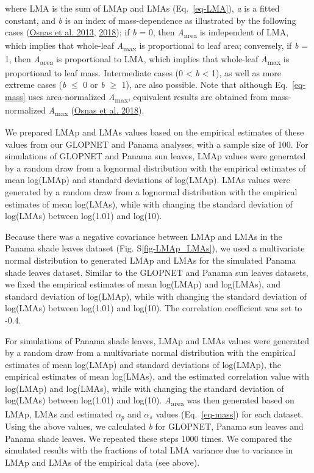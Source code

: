 \documentclass[
  12pt,
  a4paper,
,tablecaptionabove
]{scrartcl}
\begin{document}
where LMA is the sum of LMAp and LMAs (Eq.~\ref{eq-LMA}), \emph{a} is a
fitted constant, and \emph{b} is an index of mass-dependence as
illustrated by the following cases
(\protect\hyperlink{ref-Osnas2013}{Osnas et al. 2013},
\protect\hyperlink{ref-Osnas2018}{2018}): if \emph{b} = 0, then
\emph{A}\textsubscript{area} is independent of LMA, which implies that
whole-leaf \emph{A}\textsubscript{max} is proportional to leaf area;
conversely, if \emph{b} = 1, then \emph{A}\textsubscript{area} is
proportional to LMA, which implies that whole-leaf
\emph{A}\textsubscript{max} is proportional to leaf mass. Intermediate
cases (0 \textless{} \emph{b} \textless{} 1), as well as more extreme
cases (\emph{b} \(\leq\) 0 or \emph{b} \(\geq\) 1), are also possible.
Note that although Eq.~\ref{eq-mass} uses area-normalized
\emph{A}\textsubscript{max}, equivalent results are obtained from
mass-normalized \emph{A}\textsubscript{max}
(\protect\hyperlink{ref-Osnas2018}{Osnas et al. 2018}).

We prepared LMAp and LMAs values based on the empirical estimates of
these values from our GLOPNET and Panama analyses, with a sample size of
100. For simulations of GLOPNET and Panama sun leaves, LMAp values were
generated by a random draw from a lognormal distribution with the
empirical estimates of mean log(LMAp) and standard deviations of
log(LMAp). LMAs values were generated by a random draw from a lognormal
distribution with the empirical estimates of mean log(LMAs), while with
changing the standard deviation of log(LMAs) between log(1.01) and
log(10).

Because there was a negative covariance between LMAp and LMAs in the
Panama shade leaves dataset (Fig. S\ref{fig-LMAp_LMAs}), we used a
multivariate normal distribution to generated LMAp and LMAs for the
simulated Panama shade leaves dataset. Similar to the GLOPNET and Panama
sun leaves datasets, we fixed the empirical estimates of mean log(LMAp)
and log(LMAs), and standard deviation of log(LMAp), while with changing
the standard deviation of log(LMAs) between log(1.01) and log(10). The
correlation coefficient was set to -0.4.

For simulations of Panama shade leaves, LMAp and LMAs values were
generated by a random draw from a multivariate normal distribution with
the empirical estimates of mean log(LMAp) and standard deviations of
log(LMAp), the empirical estimates of mean log(LMAs), and the estimated
correlation value with log(LMAp) and log(LMAs), while with changing the
standard deviation of log(LMAs) between log(1.01) and log(10).
\emph{A}\textsubscript{area} was then generated based on LMAp, LMAs and
estimated \(\alpha_p\) and \(\alpha_s\) values (Eq.~\ref{eq-mass}) for
each dataset. Using the above values, we calculated \emph{b} for
GLOPNET, Panama sun leaves and Panama shade leaves. We repeated these
steps 1000 times. We compared the simulated results with the fractions
of total LMA variance due to variance in LMAp and LMAs of the empirical
data (see above).
\end{document}
